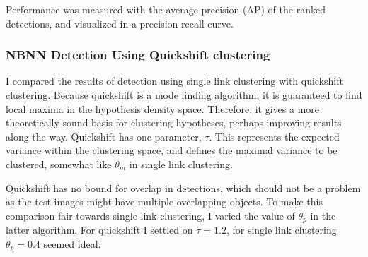 Performance was measured with the average precision (AP) of the ranked detections, and visualized in a precision-recall curve.

\subsubsection{NBNN Detection Using Quickshift clustering} %
\label{sub:nbnn_detection_using_quickshift_clustering}

I compared the results of detection using single link clustering with quickshift clustering. Because quickshift is a mode finding algorithm, it is guaranteed to find local maxima in the hypothesis density space. Therefore, it gives a more theoretically sound basis for clustering hypotheses, perhaps improving results along the way. Quickshift has one parameter, $\tau$. This represents the expected variance within the clustering space, and defines the maximal variance to be clustered, somewhat like $\theta_m$ in single link clustering.

Quickshift has no bound for overlap in detections, which should not be a problem as the test images might have multiple overlapping objects. To make this comparison fair towards single link clustering, I varied the value of $\theta_p$ in the latter algorithm. For quickshift I settled on $\tau = 1.2$, for single link clustering $\theta_p = 0.4$ seemed ideal.

